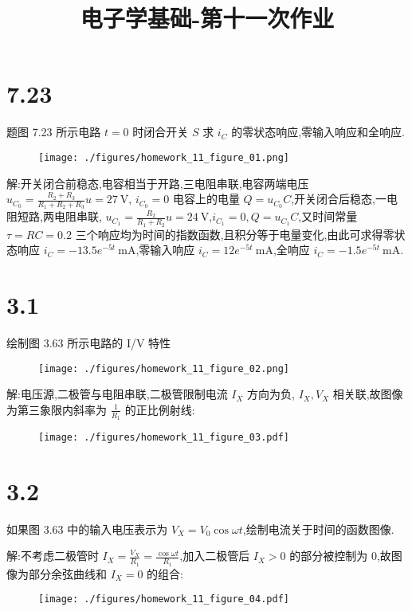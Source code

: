 
\usepackage{../../homeworks_preamble}
\title{电子学基础-第十一次作业}


    \maketitle
    \section{7.23} 题图 7.23 所示电路 $t=0$ 时闭合开关 $S$ 求 $i_{C}$ 的零状态响应,零输入响应和全响应.
    \begin{figure}[htbp]
        \centering
        \texttt{[image: ./figures/homework\_11\_figure\_01.png]}
    \end{figure}

    解:开关闭合前稳态,电容相当于开路,三电阻串联,电容两端电压 $u_{C_0}=\frac{R_2+R_3}{R_1+R_2+R_3}u=27 \ \mathrm{V}$, $i_{C_0}=0$ 电容上的电量 $Q=u_{C_0}C$,开关闭合后稳态,一电阻短路,两电阻串联, $u_{C_1}=\frac{R_2}{R_1+R_2}u=24 \ \mathrm{V}$,$i_{C_1}=0,Q=u_{C_1}C$,又时间常量 $\tau=RC=0.2$ 三个响应均为时间的指数函数,且积分等于电量变化,由此可求得零状态响应 $i_{C}=-13.5e^{-5t} \ \mathrm{mA}$,零输入响应  $i_{C}=12e^{-5t} \ \mathrm{mA}$,全响应 $i_{C}=-1.5e^{-5t} \ \mathrm{mA}$.
    \section{3.1} 绘制图 3.63 所示电路的 I/V 特性
    \begin{figure}[htbp]
        \centering
        \texttt{[image: ./figures/homework\_11\_figure\_02.png]}
    \end{figure}

    解:电压源,二极管与电阻串联,二极管限制电流 $I_{X}$ 方向为负, $I_{X},V_{X}$ 相关联,故图像为第三象限内斜率为 $\frac{1}{R_1}$ 的正比例射线:
    \begin{figure}[htbp]
        \centering
        \texttt{[image: ./figures/homework\_11\_figure\_03.pdf]}
    \end{figure}
    
    \section{3.2} 如果图 3.63 中的输入电压表示为 $V_{X}=V_0\cos\omega t$,绘制电流关于时间的函数图像.

    解:不考虑二极管时 $I_{X}=\frac{V_{X}}{R_1}=\frac{\cos\omega t}{R_1}$,加入二极管后 $I_{X}>0$ 的部分被控制为 $0$,故图像为部分余弦曲线和 $I_{X}=0$ 的组合:
    \begin{figure}[htbp]
        \centering
        \texttt{[image: ./figures/homework\_11\_figure\_04.pdf]}
    \end{figure}
    

